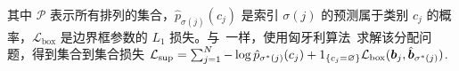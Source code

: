 其中 $\mathcal{P}$ 表示所有排列的集合，$\hat{p}_{\sigma(j)}(c_j)$ 是索引 $\sigma(j)$ 的预测属于类别 $c_j$ 的概率，$\mathcal{L}_{\mathrm{box}}$ 是边界框参数的 $L_1$ 损失。与~\cite{StewartAN16,detr}一样，使用匈牙利算法~\cite{Kuhn55thehungarian}求解该分配问题，得到集合到集合损失 $\mathcal{L_{\mathrm{sup}}} = \sum_{j=1}^N -\log\hat{p}_{\sigma^{\ast}(j)}(c_j) + 1_{\{c_j=\varnothing\}}\mathcal{L}_{\mathrm{box}}(\boldsymbol{b}_j, \hat{\boldsymbol{b}}_{\sigma^{\ast}(j)})$.



